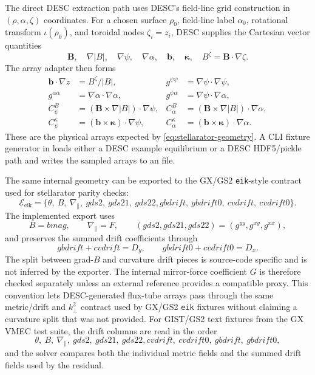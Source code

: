 \documentclass[11pt,a4paper]{article}
\newcommand{\kperp}{k_{\perp}}
\newcommand{\bvec}{\bm b}
\newcommand{\Bvec}{\bm B}
\newcommand{\grad}{\nabla}
\begin{document}
The direct DESC extraction path uses DESC's field-line grid construction in
\((\rho,\alpha,\zeta)\) coordinates.  For a chosen surface \(\rho_0\), field-line
label \(\alpha_0\), rotational transform \(\iota(\rho_0)\), and toroidal nodes
\(\zeta_i=z_i\), DESC supplies the Cartesian vector quantities
\[
  \Bvec,\quad \grad |B|,\quad \grad\psi,\quad \grad\alpha,\quad
  \bvec,\quad \bm\kappa,
  \quad B^\zeta=\Bvec\cdot\grad\zeta.
\]
The array adapter then forms
\begin{align}
  \bvec\cdot\grad z &= B^\zeta/|B|, &
  g^{\psi\psi} &= \grad\psi\cdot\grad\psi, \\
  g^{\alpha\alpha} &= \grad\alpha\cdot\grad\alpha, &
  g^{\psi\alpha} &= \grad\psi\cdot\grad\alpha, \\
  C_\psi^B &= (\Bvec\times\grad |B|)\cdot\grad\psi, &
  C_\alpha^B &= (\Bvec\times\grad |B|)\cdot\grad\alpha, \\
  C_\psi^\kappa &= (\bvec\times\bm\kappa)\cdot\grad\psi, &
  C_\alpha^\kappa &= (\bvec\times\bm\kappa)\cdot\grad\alpha.
  \label{eq:desc-array-contractions}
\end{align}
These are the physical arrays expected by \eqref{eq:stellarator-geometry}.
A CLI fixture generator in  loads either a DESC example
equilibrium or a DESC HDF5/pickle path and writes the sampled arrays to an
 file.

The same internal geometry can be exported to the GX/GS2 \texttt{eik}-style
contract used for stellarator parity checks:
\begin{equation}
  \mathcal{E}_{\mathrm{eik}}
  =
  \{
    \theta,\ B,\ \grad_\parallel,\ gds2,\ gds21,\ gds22,
    gbdrift,\ gbdrift0,\ cvdrift,\ cvdrift0
  \}.
  \label{eq:eik-export-contract}
\end{equation}
The implemented export uses
\[
  B=bmag,\qquad
  \grad_\parallel=F,\qquad
  (gds2,gds21,gds22)=(g^{yy},g^{xy},g^{xx}),
\]
and preserves the summed drift coefficients through
\[
  gbdrift+cvdrift=D_y,\qquad
  gbdrift0+cvdrift0=D_x.
\]
The split between grad-\(B\) and curvature drift pieces is source-code
specific and is not inferred by the exporter.  The internal mirror-force
coefficient \(G\) is therefore checked separately unless an external reference
provides a compatible proxy.  This convention lets DESC-generated flux-tube
arrays pass through the same metric/drift and \(\kperp^2\) contract used by
GX/GS2 \texttt{eik} fixtures without claiming a curvature split that was not
provided.
For GIST/GS2 text fixtures from the GX VMEC test suite, the drift columns are
read in the order
\[
  \theta,\ B,\ \grad_\parallel,\ gds2,\ gds21,\ gds22,
  cvdrift,\ cvdrift0,\ gbdrift,\ gbdrift0,
\]
and the solver compares both the individual metric fields and the summed drift
fields used by the residual.
\end{document}
